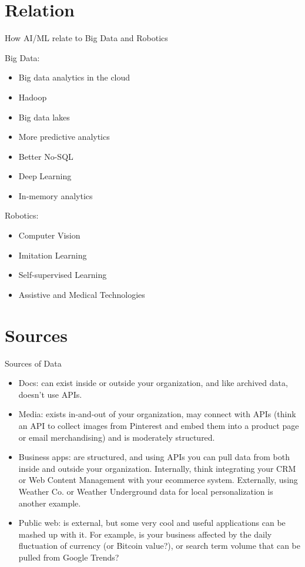 \documentclass{beamer}
\begin{document}
\section{Relation}
\begin{frame}{How AI/ML relate to Big Data and Robotics}
\begin{multicols}{2}
Big Data:
\begin{itemize}
\item Big data analytics in the cloud
\item Hadoop
\item Big data lakes
\item More predictive analytics
\item Better No-SQL
\item Deep Learning
\item In-memory analytics
\end{itemize}
\columnbreak
Robotics:
\begin{itemize}
\item Computer Vision
\item Imitation Learning
\item Self-supervised Learning
\item Assistive and Medical Technologies
\end{itemize}
\end{multicols}
\end{frame}

\section{Sources}
\begin{frame}{Sources of Data}
\begin{itemize}
\item Docs: can exist inside or outside your organization, and like archived data, doesn’t use APIs.
\item Media: exists in-and-out of your organization, may connect with APIs (think an API to collect images from Pinterest and embed them into a product page or email merchandising) and is moderately structured.
\item Business apps: are structured, and using APIs you can pull data from both inside and outside your organization. Internally, think integrating your CRM or Web Content Management with your ecommerce system. Externally, using Weather Co. or Weather Underground data for local personalization is another example.
\item Public web: is external, but some very cool and useful applications can be mashed up with it. For example, is your business affected by the daily fluctuation of currency (or Bitcoin value?), or search term volume that can be pulled from Google Trends?
\end{itemize}
\end{frame}
\end{document}
